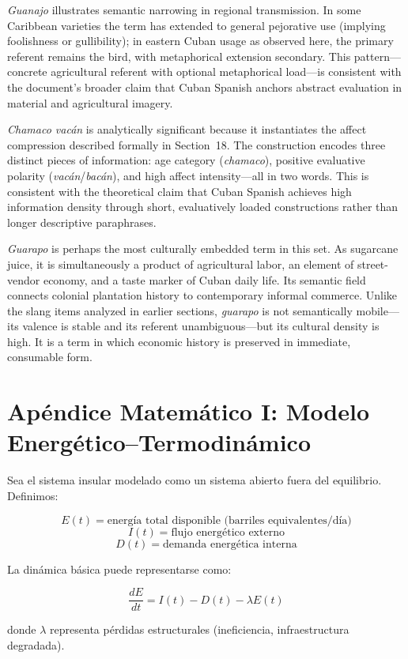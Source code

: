 \documentclass[12pt]{article}
\begin{document}
\textit{Guanajo} illustrates semantic narrowing in regional transmission. In some Caribbean varieties the term has extended to general pejorative use (implying foolishness or gullibility); in eastern Cuban usage as observed here, the primary referent remains the bird, with metaphorical extension secondary. This pattern---concrete agricultural referent with optional metaphorical load---is consistent with the document's broader claim that Cuban Spanish anchors abstract evaluation in material and agricultural imagery.

\textit{Chamaco vacán} is analytically significant because it instantiates the affect compression described formally in Section~18. The construction encodes three distinct pieces of information: age category (\textit{chamaco}), positive evaluative polarity (\textit{vacán}/\textit{bacán}), and high affect intensity---all in two words. This is consistent with the theoretical claim that Cuban Spanish achieves high information density through short, evaluatively loaded constructions rather than longer descriptive paraphrases.

\textit{Guarapo} is perhaps the most culturally embedded term in this set. As sugarcane juice, it is simultaneously a product of agricultural labor, an element of street-vendor economy, and a taste marker of Cuban daily life. Its semantic field connects colonial plantation history to contemporary informal commerce. Unlike the slang items analyzed in earlier sections, \textit{guarapo} is not semantically mobile---its valence is stable and its referent unambiguous---but its cultural density is high. It is a term in which economic history is preserved in immediate, consumable form.

\section{Apéndice Matemático I: Modelo Energético--Termodinámico}

Sea el sistema insular modelado como un sistema abierto fuera del equilibrio. Definimos:

\[
E(t) = \text{energía total disponible (barriles equivalentes/día)}
\]
\[
I(t) = \text{flujo energético externo}
\]
\[
D(t) = \text{demanda energética interna}
\]

La dinámica básica puede representarse como:

\[
\frac{dE}{dt} = I(t) - D(t) - \lambda E(t)
\]

donde \( \lambda \) representa pérdidas estructurales (ineficiencia, infraestructura degradada).
\end{document}

